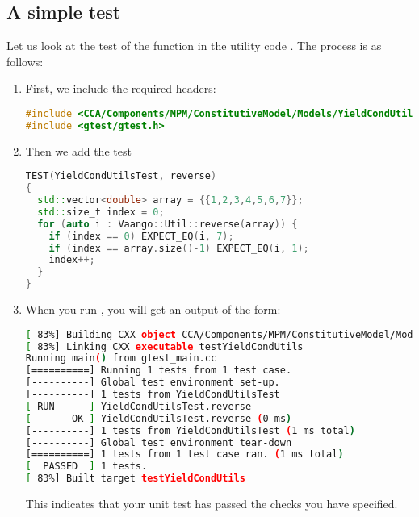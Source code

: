 \subsection{A simple test}
Let us look at the test of the  function in the utility 
code .
The process is as follows:
\begin{enumerate}
  \item First, we include the required headers:
\begin{lstlisting}[language=Cpp]
#include <CCA/Components/MPM/ConstitutiveModel/Models/YieldCondUtils.h>
#include <gtest/gtest.h>
\end{lstlisting}

  \item Then we add the test
\begin{lstlisting}[language=Cpp]
TEST(YieldCondUtilsTest, reverse)
{
  std::vector<double> array = {{1,2,3,4,5,6,7}};
  std::size_t index = 0;
  for (auto i : Vaango::Util::reverse(array)) {
    if (index == 0) EXPECT_EQ(i, 7);
    if (index == array.size()-1) EXPECT_EQ(i, 1);
    index++;
  }
}
\end{lstlisting}

  \item When you run , you will get an output of the form:
\begin{lstlisting}[language=sh, backgroundcolor=\color{background}]
[ 83%] Building CXX object CCA/Components/MPM/ConstitutiveModel/Models/UnitTests/CMakeFiles/testYieldCondUtils.dir/testYieldCondUtils.cc.o
[ 83%] Linking CXX executable testYieldCondUtils
Running main() from gtest_main.cc
[==========] Running 1 tests from 1 test case.
[----------] Global test environment set-up.
[----------] 1 tests from YieldCondUtilsTest
[ RUN      ] YieldCondUtilsTest.reverse
[       OK ] YieldCondUtilsTest.reverse (0 ms)
[----------] 1 tests from YieldCondUtilsTest (1 ms total)
[----------] Global test environment tear-down
[==========] 1 tests from 1 test case ran. (1 ms total)
[  PASSED  ] 1 tests.
[ 83%] Built target testYieldCondUtils
\end{lstlisting}
       This indicates that your unit test has passed the checks you have specified.
\end{enumerate}


